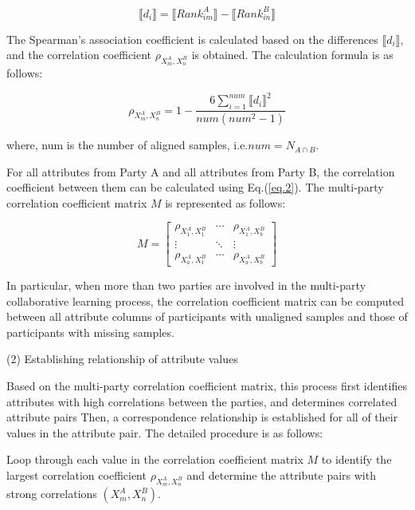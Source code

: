 \documentclass[final,1p,times]{elsarticle}
\begin{document}
\begin{equation}
\llbracket d_i \rrbracket = \llbracket {Rank}_{im}^A \rrbracket - \llbracket {Rank}_{in}^B \rrbracket
\label{eq.1}
\end{equation}

The Spearman's association coefficient\cite{add1} is calculated based on the differences $\llbracket d_i \rrbracket$, and the correlation coefficient $\rho_{X_m^A,X_n^B}$ is obtained. The calculation formula is as follows:

\begin{equation}
	\rho_{X_m^A,X_n^B}=1-\frac{6\sum_{i=1}^{num}\llbracket d_i \rrbracket^2}{num(num^2-1)}
	\label{eq.2}
\end{equation}

where, num is the number of aligned samples, i.e.$num=N_{A\cap B}$.

For all attributes from Party A and all attributes from Party B, the correlation  coefficient between them can be calculated using Eq.(\ref{eq.2}). The multi-party correlation coefficient matrix $M$ is represented as follows:

\begin{equation}
	M=\begin{bmatrix}\rho_{X_1^A,X_1^B}&\cdots&\rho_{X_1^A,X_{b}^B}\\\vdots&\ddots&\vdots\\\rho_{X_{a}^A,X_1^B}&\cdots&\rho_{X_{a}^A,X_{b}^B}\end{bmatrix}
	\label{eq.3}
\end{equation}

In particular, when more than two parties are involved in the multi-party collaborative learning process, the correlation coefficient matrix can be computed between all attribute columns of participants with unaligned samples and those of participants with missing samples.

(2) Establishing relationship of attribute values

Based on the multi-party correlation coefficient matrix, this process first identifies attributes with high correlations between the parties, and determines correlated attribute pairs Then, a correspondence relationship is established for all of their values in the attribute pair. The detailed procedure is as follows:

Loop through each value in the correlation coefficient matrix $M$ to identify the largest correlation coefficient $ \rho_{{X}_m^A, {X}_n^B} $ and determine the attribute pairs with strong correlations $({X_m^A,X_n^B})$.
\end{document}
